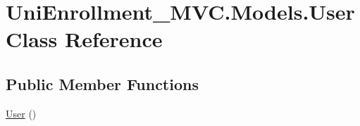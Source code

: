 \hypertarget{class_uni_enrollment___m_v_c_1_1_models_1_1_user}{}\section{Uni\+Enrollment\+\_\+\+M\+V\+C.\+Models.\+User Class Reference}
\label{class_uni_enrollment___m_v_c_1_1_models_1_1_user}
\subsection*{Public Member Functions}
\begin{DoxyCompactItemize}
\item 
\hyperlink{class_uni_enrollment___m_v_c_1_1_models_1_1_user_a094a61319568118725591779a5b582be}{User} ()
\end{DoxyCompactItemize}
